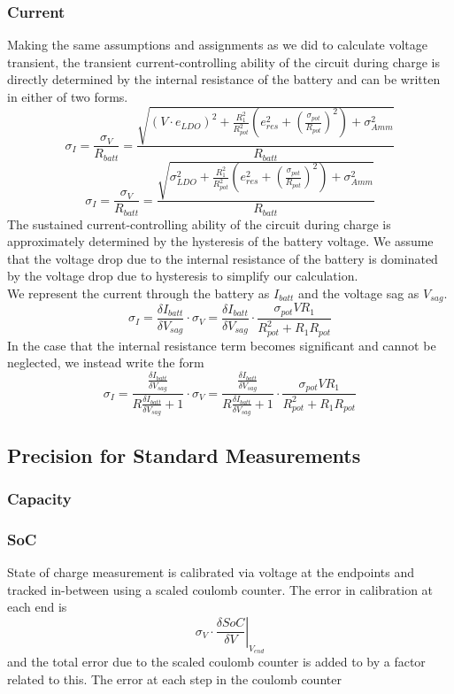 \documentclass{article}
\begin{document}
\subsubsection{Current}
Making the same assumptions and assignments as we did to calculate voltage transient, the transient current-controlling ability of the circuit during charge is directly determined by the internal resistance of the battery and can be written in either of two forms.
$$\sigma_I = \frac{\sigma_V}{R_{batt}} = \frac{\sqrt{\left(V\cdot e_{LDO}\right)^{2}+\frac{R_{1}^2}{R_{pot}^2}\left(e_{res}^{2}+\left(\frac{\sigma_{pot}}{R_{pot}}\right)^{2}\right)+\sigma_{Amm}^2}}{R_{batt}}$$
$$\sigma_I = \frac{\sigma_V}{R_{batt}} = \frac{\sqrt{\sigma_{LDO}^{2}+\frac{R_{1}^2}{R_{pot}^2}\left(e_{res}^{2}+\left(\frac{\sigma_{pot}}{R_{pot}}\right)^{2}\right)+\sigma_{Amm}^2}}{R_{batt}}$$
The sustained current-controlling ability of the circuit during charge is approximately determined by the hysteresis of the battery voltage. We assume that the voltage drop due to the internal resistance of the battery is dominated by the voltage drop due to hysteresis to simplify our calculation.\\
We represent the current through the battery as $I_{batt}$ and the voltage sag as $V_{sag}$.
$$\sigma_I = \frac{\delta I_{batt}}{\delta V_{sag}}\cdot \sigma_V = \frac{\delta I_{batt}}{\delta V_{sag}}\cdot \frac{\sigma_{pot}VR_{1}}{R_{pot}^{2}+R_{1}R_{pot}}$$
In the case that the internal resistance term becomes significant and cannot be neglected, we  instead write the form
$$\sigma_I = \frac{\frac{\delta I_{batt}}{\delta V_{sag}}}{R\frac{\delta I_{batt}}{\delta V_{sag}}+1}\cdot \sigma_V = \frac{\frac{\delta I_{batt}}{\delta V_{sag}}}{R\frac{\delta I_{batt}}{\delta V_{sag}}+1}\cdot \frac{\sigma_{pot}VR_{1}}{R_{pot}^{2}+R_{1}R_{pot}}$$
\subsection{Precision for Standard Measurements}
\subsubsection{Capacity}
\subsubsection{SoC}
State of charge measurement is calibrated via voltage at the endpoints and tracked in-between using a scaled coulomb counter. The error in calibration at each end is
$$\left.\sigma_V \cdot \frac{\delta SoC}{\delta V}\right\vert_{V_{end}}$$
and the total error due to the scaled coulomb counter is added to by a factor related to this. The error at each step in the coulomb counter
\end{document}
